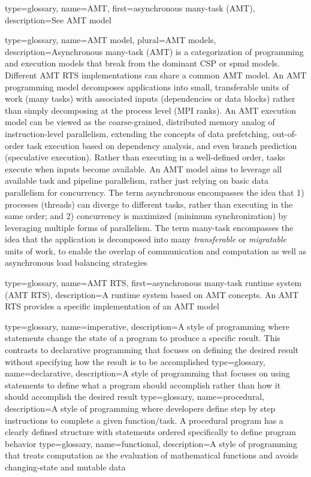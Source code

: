 {
  type=glossary,
  name={AMT},
  first={asynchronous many-task (AMT)},
  description={See \gls{AMT model}}
}

{
  type=glossary,
  name={AMT model},
  plural={AMT models},
  description={Asynchronous many-task (AMT) is a categorization of programming
    and \glspl{execution model} that break from the dominant \gls{CSP} or \gls{spmd} models.
      Different \gls{AMT RTS} implementations can share a common AMT model.
	An AMT \gls{programming model} decomposes applications into small, transferable units of work (many tasks) with associated inputs (dependencies or data blocks) rather than simply decomposing at the process level (\gls{MPI} ranks).
	An AMT execution model can be viewed as the coarse-grained, distributed memory analog of instruction-level parallelism, extending the concepts of data prefetching,
	out-of-order task execution based on dependency analysis, and even branch prediction (speculative execution). 
	Rather than executing in a well-defined order, tasks execute when inputs become available.
	An AMT model aims to leverage all available task and pipeline parallelism, rather just relying on basic data parallelism for concurrency.
	The term asynchronous encompasses the idea that 1) processes (threads) can
  diverge to different tasks, rather than executing in the same order; and 2) concurrency is maximized (minimum synchronization) by leveraging multiple forms of parallelism.
	The term many-task encompasses the idea that the application is decomposed into many \emph{transferable} or \emph{migratable} units of work, to enable the overlap of communication and computation as well as asynchronous load balancing strategies}
}



{
  type=glossary,
  name={AMT RTS},
  first={asynchronous many-task runtime system (AMT RTS)},
  description={A runtime system based on \gls{AMT} concepts. An AMT RTS provides a specific implementation of an \gls{AMT model}}
}

{
  type=glossary,
  name={imperative},
  description={A style of programming where statements change the state of a program to produce a specific result. This contrasts to declarative programming that focuses on defining the desired result without specifying how the result is to be accomplished}
}
{
  type=glossary,
  name={declarative},
  description={A style of programming that focuses on using statements to define what a program should accomplish rather than how it should accomplish the desired result}
}
{
  type=glossary,
  name={procedural},
  description={A style of programming where developers define step by step instructions to complete a given function/task. A procedural program has a clearly defined structure with statements ordered specifically to define program behavior}
}
{
  type=glossary,
  name={functional},
  description={A style of programming that treats computation as the
    evaluation of mathematical functions and avoids changing-state and mutable
      data}
}


